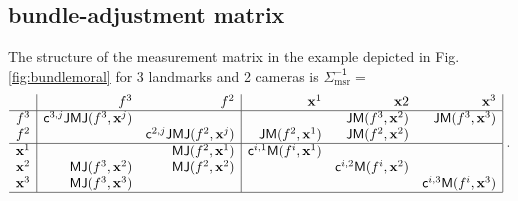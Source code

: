 \documentclass[conference]{IEEEtran}
\newcommand{\meas}{\mathsf{\Sigma^{-1}_\mathrm{msr}}}
\newcommand{\JMJ}{\mathsf{JMJ}}
\newcommand{\JM}{\mathsf{JM}}
\newcommand{\MJ}{\mathsf{MJ}}
\newcommand{\beq}{\begin{equation}}
\newcommand{\eeq}{\end{equation}}
\begin{document}
\begin{appendix}
\subsection{bundle-adjustment matrix}
The structure of the measurement matrix in the example depicted in Fig.\ref{fig:bundlemoral} for 3 landmarks and 2 cameras
is $\meas=$
\beq
    \begin{array}{r|rr|rrr|}
        & f^3 & f^2 & {\bf x}^1 & {\bf x}2 & {\bf x}^3 \\
        \hline
       f^3 & {\sf c}^{3,j}\JMJ(f^3,{\bf x}^j) & & & \JM(f^3,{\bf x}^2) & \JM(f^3,{\bf x}^3) \\
       f^2 & & {\sf  c}^{2,j}\JMJ(f^2,{\bf x}^j) & \JM(f^2,{\bf x}^1) & \JM(f^2,{\bf x}^2) & \\
        \hline
       {\bf x}^1 &  & \MJ(f^2,{\bf x}^1) & {\sf c}^{i,1}{\sf M}(f^i,{\bf x}^1) & & \\
       {\bf x}^2 &  \MJ(f^3,{\bf x}^2) & \MJ(f^2,{\bf x}^2) & & {\sf c}^{i,2}{\sf  M}(f^i,{\bf x}^2) & \\
       {\bf x}^3 & \MJ(f^3,{\bf x}^3) & & & & {\sf c}^{i,3}{\sf M}(f^i,{\bf x}^3) \\
        \hline
    \end{array}
    \;. \nonumber
\eeq

\end{appendix}
\end{document}
